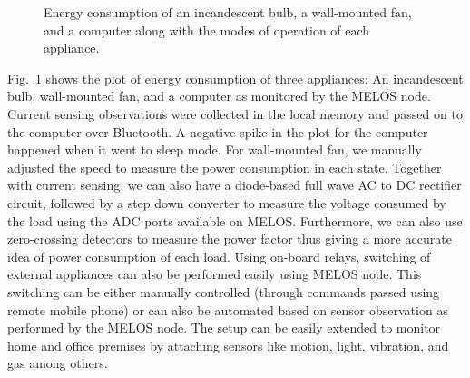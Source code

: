 \documentclass[10pt]{sigplan-proc-varsize}
\newcommand{\figref}[1]{Fig.~\ref{#1}}
\newcommand{\redcolor}[1]{\textcolor{red}{#1}}
\newcommand{\melos}{MELOS }
\newcommand{\melosnospace}{MELOS}
\begin{document}
\begin{figure}
\centering
{}
\caption{Energy consumption of an incandescent bulb, a wall-mounted fan, and a computer along with the modes of operation of each appliance.}
\label{fig:energychart}
\end{figure}


\figref{fig:energychart} shows the plot of energy consumption of three appliances: An incandescent bulb, wall-mounted fan, and a computer as monitored by the \melos node. Current sensing observations were collected in the local memory and passed on to the computer over Bluetooth. A negative spike in the plot for the computer happened when it went to sleep mode. For wall-mounted fan, we manually adjusted the speed to measure the power consumption in each state. 
Together with current sensing, we can also have a diode-based full wave AC to DC rectifier circuit, followed by a step down converter to measure the voltage consumed by the load using the ADC ports available on \melosnospace. Furthermore, we can also use zero-crossing detectors to measure the power factor thus giving a more accurate idea of power consumption of each load. Using on-board relays, switching of external appliances can also be performed easily using \melos node. This switching can be either manually controlled (through commands passed using remote mobile phone) or can also be automated based on sensor observation as performed by the \melos node. The setup can be easily extended to monitor home and office premises by attaching sensors like motion, light, vibration, and gas among others.
\end{document}
